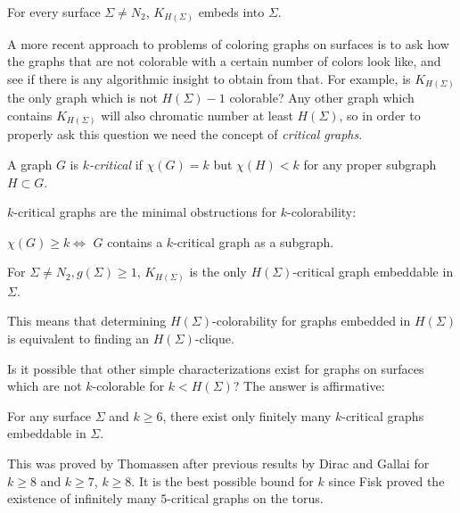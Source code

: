 \begin{theorem}
For every surface $\Sigma \neq N_2$, $K_{H(\Sigma)}$ embeds into $\Sigma$.
\end{theorem}

A more recent approach to problems of coloring graphs on surfaces is to ask how the graphs
that are not colorable with a certain number of colors look like, and see if there is any 
algorithmic insight to obtain from that.
For example, is $K_{H(\Sigma)}$ the only graph which is not $H(\Sigma)-1$ colorable?
Any other graph which contains $K_{H(\Sigma)}$ will also chromatic number at least $H(\Sigma)$,
so in order to properly ask this question we need the concept of \emph{critical graphs}.

\begin{definition}
A graph $G$ is \emph{$k$-critical} if $\chi(G) = k$ but $\chi(H) < k$ for any proper subgraph
$H \subset G$. 
\end{definition}

$k$-critical graphs are the minimal obstructions for $k$-colorability:

\begin{observation}
$\chi(G) \geq k \iff$ $G$ contains a $k$-critical graph as a subgraph.
\end{observation}

\begin{theorem}
For $\Sigma \neq N_2, g(\Sigma) \geq 1$, $K_{H(\Sigma)}$ is the only $H(\Sigma)$-critical graph
embeddable in $\Sigma$.
\end{theorem}

This means that determining $H(\Sigma)$-colorability for graphs embedded in $H(\Sigma)$ is 
equivalent to finding an $H(\Sigma)$-clique. 

Is it possible that other simple characterizations exist for graphs on surfaces which are 
not $k$-colorable for $k < H(\Sigma)$? The answer is affirmative:

\begin{theorem}
For any surface $\Sigma$ and $k \geq 6$, there exist only finitely many $k$-critical graphs 
embeddable in $\Sigma$.
\end{theorem}

This was proved by Thomassen after previous results by Dirac and Gallai for $k \geq 8$
and $k \geq 7$, $k \geq 8$. It is the best possible bound for $k$ since Fisk \cite{fisk} proved
the existence of infinitely many $5$-critical graphs on the torus.


